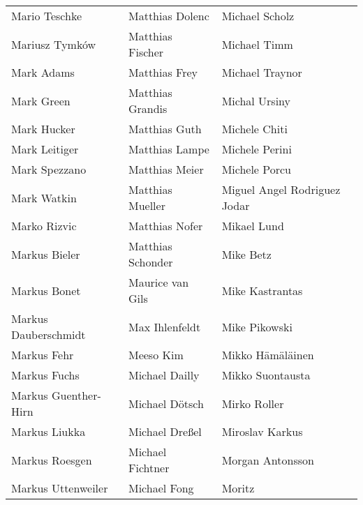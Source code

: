 \begin{tabular}{p{4.5cm}p{4.5cm}p{4.5cm}}
Mario Teschke & Matthias Dolenc & Michael Scholz \\
Mariusz Tymków & Matthias Fischer & Michael Timm \\
Mark Adams & Matthias Frey & Michael Traynor \\
Mark Green & Matthias Grandis & Michal Ursiny \\
Mark Hucker & Matthias Guth & Michele Chiti \\
Mark Leitiger & Matthias Lampe & Michele Perini \\
Mark Spezzano & Matthias Meier & Michele Porcu \\
Mark Watkin & Matthias Mueller & Miguel Angel Rodriguez Jodar \\
Marko Rizvic & Matthias Nofer & Mikael Lund \\
Markus Bieler & Matthias Schonder & Mike Betz \\
Markus Bonet & Maurice van Gils & Mike Kastrantas \\
Markus Dauberschmidt & Max Ihlenfeldt & Mike Pikowski \\
Markus Fehr & Meeso Kim & Mikko Hämäläinen \\
Markus Fuchs & Michael Dailly & Mikko Suontausta \\
Markus Guenther-Hirn & Michael Dötsch & Mirko Roller \\
Markus Liukka & Michael Dreßel & Miroslav Karkus \\
Markus Roesgen & Michael Fichtner & Morgan Antonsson \\
Markus Uttenweiler & Michael Fong & Moritz \\
\end{tabular}
\newpage
\setlength{\tabcolsep}{1mm}
